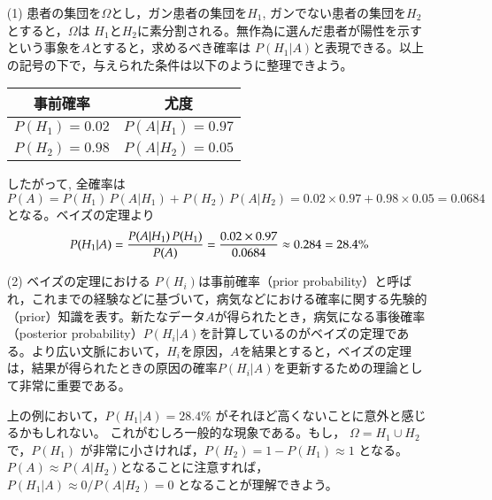 \begin{解答}
\begin{enumerate}
\item[(1)] 患者の集団を$\Omega$とし，ガン患者の集団を$H_1$, ガンでない患者の集団を$H_2$とすると，$\Omega$は
$H_1$と$H_2$に素分割される。無作為に選んだ患者が陽性を示すという事象を$A$とすると，求めるべき確率は
$P(H_1|A)$と表現できる。以上の記号の下で，与えられた条件は以下のように整理できよう。

\begin{center}
  \begin{tabular}{c|c} \hline
    事前確率 & 尤度 \\ \hline 
    $P(H_1)= 0.02 $ & $ P(A|H_1) = 0.97$ \\
    $P(H_2)= 0.98$ & $P(A|H_2) = 0.05$ \\ \hline
  \end{tabular}
\end{center}

したがって, 全確率は
$$
P(A) =  P(H_1) \, P(A|H_1) + P(H_2) \, P(A|H_2) = 0.02\times 0.97 + 0.98 \times 0.05 = 0.0684
$$
となる。ベイズの定理より
$$
P(H_1|A) = {P(A|H_1) \, P(H_1) \over P(A)} = {0.02\times 0.97 \over 0.0684} \approx 0.284 = 28.4\%
$$


\item[(2)] ベイズの定理における $P(H_i)$は事前確率（prior probability）と呼ばれ，これまでの経験などに基づいて，病気などにおける確率に関する先験的（prior）知識を表す。新たなデータ$A$が得られたとき，病気になる事後確率（posterior probability）$P(H_i|A)$を計算しているのがベイズの定理である。より広い文脈において，$H_i$を原因，$A$を結果とすると，ベイズの定理は，結果が得られたときの原因の確率$P(H_i|A)$を更新するための理論として非常に重要である。

上の例において，$P(H_1|A) = 28.4\%$ がそれほど高くないことに意外と感じるかもしれない。
これがむしろ一般的な現象である。もし，
$\Omega = H_1\cup H_2$ で，$P(H_1)$ が非常に小さければ，$P(H_2) = 1- P(H_1) \approx 1$ となる。
$P(A) \approx P(A|H_2)$となることに注意すれば，
$
P(H_1|A) \approx 0 /  P(A|H_2) = 0
$
となることが理解できよう。
\end{enumerate}

\end{解答}

